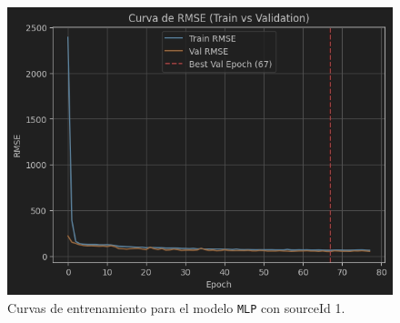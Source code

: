 \begin{figure}[H]
\begin{minipage}{0.48\textwidth}
		\vspace{0.2cm}
		\includegraphics[width=\linewidth]{includes/cap5/graphs/sid1_mlp_rmse.png}
	\end{minipage}
	\caption{Curvas de entrenamiento para el modelo \texttt{MLP} con sourceId 1.}
	\label{fig:curvas_sid1_mlp}
\end{figure}

